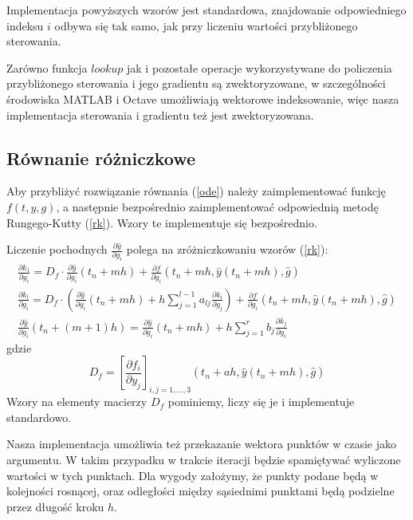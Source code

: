 \documentclass[11pt]{article}
\begin{document}
Implementacja powyższych wzorów jest standardowa, znajdowanie odpowiedniego indeksu $i$ odbywa się tak samo, jak przy liczeniu wartości przybliżonego sterowania.

Zarówno funkcja $lookup$ jak i pozostałe operacje wykorzystywane do policzenia przybliżonego sterowania i jego gradientu są zwektoryzowane, w szczególności środowiska MATLAB i Octave umożliwiają wektorowe indeksowanie, więc nasza implementacja sterowania i gradientu też jest zwektoryzowana.

\subsection{Równanie różniczkowe}
Aby przybliżyć rozwiązanie równania (\ref{ode}) należy zaimplementować funkcję $f(t,y,g)$, a następnie bezpośrednio zaimplementować odpowiednią metodę Rungego-Kutty (\ref{rk}). Wzory te implementuje się bezpośrednio.

Liczenie pochodnych $\frac{\partial \hat{y}}{\partial g_i}$ polega na zróżniczkowaniu wzorów (\ref{rk}):
\begin{gather}
    \frac{\partial k_1}{\partial g_i} = D_f \cdot \frac{\partial \hat{y}}{\partial g_i}(t_n + mh) + \frac{\partial f}{\partial g_i}(t_n + mh, \hat{y}(t_n + mh), \hat{g}) \nonumber \\
    \frac{\partial k_l}{\partial g_i}  = D_f \cdot \left(\frac{\partial \hat{y}}{\partial g_i}(t_n + mh) + h\sum_{j=1}^{l-1} a_{lj}\frac{\partial k_i}{\partial g_j} \right) + \frac{\partial f}{\partial g_i}(t_n + mh, \hat{y}(t_n + mh), \hat{g})  \label{drk}\\
    \frac{\partial \hat{y}}{\partial g_i}(t_n + (m+1)h) = \frac{\partial \hat{y}}{\partial g_i}(t_n + mh) + h\sum_{j=1}^r b_j \frac{\partial k_j}{\partial g_i} \nonumber
\end{gather}
gdzie
\begin{equation} \label{Df}
  D_f = {\left[\frac{\partial f_i}{\partial y_j}\right]}_{i,j = 1,\ldots, 3} (t_n + ah, \hat{y}(t_n + mh), \hat{g})
\end{equation}
Wzory na elementy macierzy $D_f$ pominiemy, liczy się je i implementuje standardowo.

Nasza implementacja umożliwia też przekazanie wektora punktów w czasie jako argumentu. W takim przypadku w trakcie iteracji będzie spamiętywać wyliczone wartości w tych punktach. Dla wygody założymy, że punkty podane będą w kolejności rosnącej, oraz odległości między sąsiednimi punktami będą podzielne przez długość kroku $h$.
\end{document}
